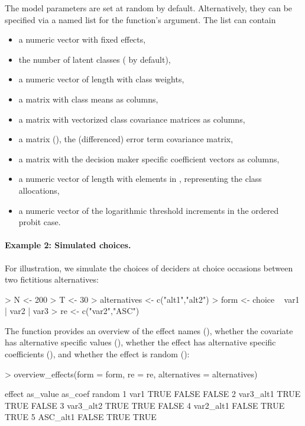 \documentclass[article,shortnames]{jss}
\newcommand{\fct}[1]{\code{#1()}}
\begin{document}
The model parameters are set at random by default. Alternatively, they can be specified via a named list for the function's  argument. The list can contain
\begin{itemize}
  \item a numeric vector  with fixed effects,
  \item the number  of latent classes ( by default),
  \item a numeric vector  of length  with class weights,
  \item a matrix  with class means as columns,
  \item a matrix  with vectorized class covariance matrices as columns,
  \item a matrix  (), the (differenced) error term covariance matrix,
  \item a matrix  with the decision maker specific coefficient vectors as columns,
  \item a numeric vector  of length  with elements in , representing the class allocations,
  \item a numeric vector  of the logarithmic threshold increments in the ordered probit case.
\end{itemize}

\paragraph{Example 2: Simulated choices.}

For illustration, we simulate the choices of  deciders at  choice occasions between two fictitious alternatives:

\begin{Schunk}
\begin{Sinput}
> N <- 200
> T <- 30
> alternatives <- c("alt1","alt2")
> form <- choice ~ var1 | var2 | var3
> re <- c("var2","ASC")
\end{Sinput}
\end{Schunk}

The \fct{overview\_effects} function provides an overview of the effect names (), whether the covariate has alternative specific values (), whether the effect has alternative specific coefficients (), and whether the effect is random ():

\begin{Schunk}
\begin{Sinput}
> overview_effects(form = form, re = re, alternatives = alternatives)
\end{Sinput}
\begin{Soutput}
     effect as_value as_coef random
1      var1     TRUE   FALSE  FALSE
2 var3_alt1     TRUE    TRUE  FALSE
3 var3_alt2     TRUE    TRUE  FALSE
4 var2_alt1    FALSE    TRUE   TRUE
5  ASC_alt1    FALSE    TRUE   TRUE
\end{Soutput}
\end{Schunk}
\end{document}
